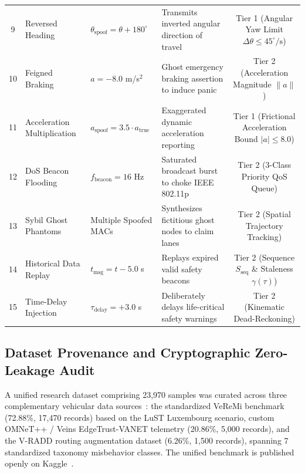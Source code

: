 \documentclass[conference]{IEEEtran}
\begin{document}
\begin{table}[t]
{\begin{tabular}{clp{3.8cm}p{6.0cm}c}
9 & Reversed Heading & $\theta_{\text{spoof}} = \theta + 180^\circ$ & Transmits inverted angular direction of travel & Tier 1 (Angular Yaw Limit $\Delta\theta \le 45^\circ/\text{s}$) \\
10 & Feigned Braking & $a = -8.0$ m/s$^2$ & Ghost emergency braking assertion to induce panic & Tier 2 (Acceleration Magnitude $\|a\|$) \\
11 & Acceleration Multiplication & $a_{\text{spoof}} = 3.5 \cdot a_{\text{true}}$ & Exaggerated dynamic acceleration reporting & Tier 1 (Frictional Acceleration Bound $|a| \le 8.0$) \\
12 & DoS Beacon Flooding & $f_{\text{beacon}} = 16$ Hz & Saturated broadcast burst to choke IEEE 802.11p & Tier 2 (3-Class Priority QoS Queue) \\
13 & Sybil Ghost Phantoms & Multiple Spoofed MACs & Synthesizes fictitious ghost nodes to claim lanes & Tier 2 (Spatial Trajectory Tracking) \\
14 & Historical Data Replay & $t_{\text{msg}} = t - 5.0$ s & Replays expired valid safety beacons & Tier 2 (Sequence $S_{\text{seq}}$ \& Staleness $\gamma(\tau)$) \\
15 & Time-Delay Injection & $\tau_{\text{delay}} = +3.0$ s & Deliberately delays life-critical safety warnings & Tier 2 (Kinematic Dead-Reckoning) \\
\bottomrule
\end{tabular}%
}
\end{table}

\subsection{Dataset Provenance and Cryptographic Zero-Leakage Audit}

A unified research dataset comprising 23,970 samples was curated across three complementary vehicular data sources~\cite{edgetrust}: the standardized VeReMi benchmark (72.88\%, 17,470 records) based on the LuST Luxembourg scenario, custom OMNeT++ / Veins EdgeTrust-VANET telemetry (20.86\%, 5,000 records), and the V-RADD routing augmentation dataset (6.26\%, 1,500 records), spanning 7 standardized taxonomy misbehavior classes. The unified benchmark is published openly on Kaggle~\cite{edgetrust}.
\end{document}
